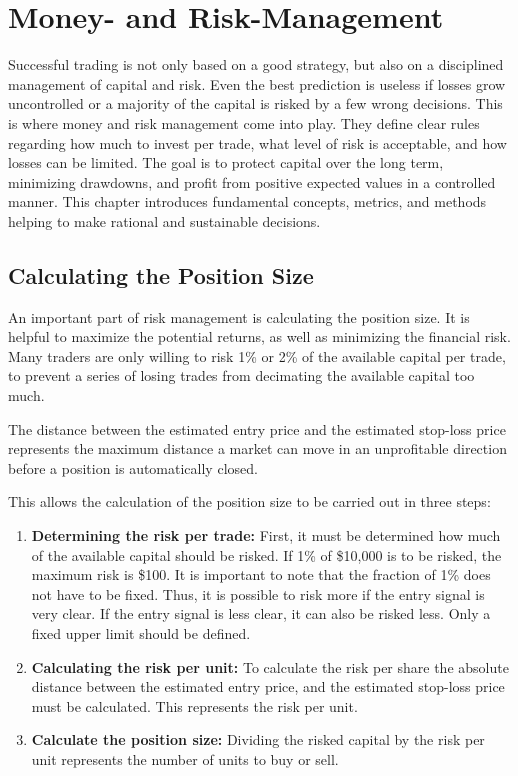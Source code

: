 \section{Money- and Risk-Management}
\label{chap:risk-man}

Successful trading is not only based on a good strategy, but also on a disciplined management of capital and risk.
Even the best prediction is useless if losses grow uncontrolled or a majority of the capital is risked by a few wrong decisions.
This is where money and risk management come into play.
They define clear rules regarding how much to invest per trade, what level of risk is acceptable, and how losses can be limited.
The goal is to protect capital over the long term, minimizing drawdowns, and profit from positive expected values in a controlled manner.
This chapter introduces fundamental concepts, metrics, and methods helping to make rational and sustainable decisions.

\subsection{Calculating the Position Size}

An important part of risk management is calculating the position size.
It is helpful to maximize the potential returns, as well as minimizing the financial risk.
Many traders are only willing to risk 1\% or 2\% of the available capital per trade, to prevent a series of losing trades from decimating the available capital too much.

The distance between the estimated entry price and the estimated stop-loss price represents the maximum distance a market can move in an unprofitable direction before a position is automatically closed.

This allows the calculation of the position size to be carried out in three steps:

\begin{enumerate}
    \item \textbf{Determining the risk per trade:} First, it must be determined how much of the available capital should be risked.
    If 1\% of \$10,000 is to be risked, the maximum risk is \$100.
    It is important to note that the fraction of 1\% does not have to be fixed.
    Thus, it is possible to risk more if the entry signal is very clear.
    If the entry signal is less clear, it can also be risked less.
    Only a fixed upper limit should be defined.
    \item \textbf{Calculating the risk per unit:} To calculate the risk per share the absolute distance between the estimated entry price, and the estimated stop-loss price must be calculated.
    This represents the risk per unit.
    \item \textbf{Calculate the position size:} Dividing the risked capital by the risk per unit represents the number of units to buy or sell.
\end{enumerate}

